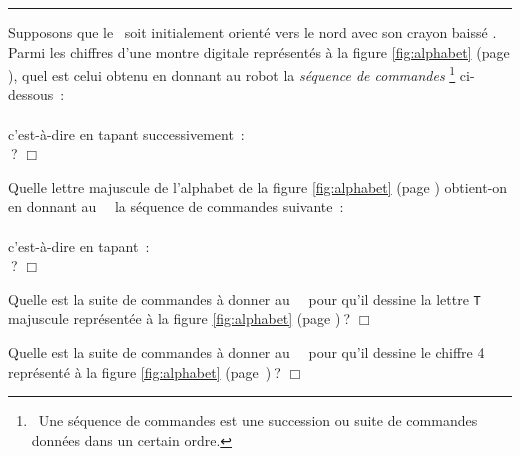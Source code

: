\clearpage\nopagebreak
\noindent \rule{137mm}{0.1mm} %
\begin{exercice}{
Supposons que le \robot\ soit initialement orienté vers le nord
avec son crayon baissé \robotCbN\/.  Parmi les chiffres d'une montre digitale 
re\-pré\-sen\-tés à la figure \ref{fig:alphabet} (page \pageref{fig:alphabet}), quel est
celui obtenu en donnant au robot la {\em séquence de commandes}%
\footnote{\ Une séquence  de commandes est une succession ou suite de commandes données dans un certain ordre.}
  \hbox{ci-dessous~:}\\
\hspace*{2ex}{\idt pqtd$;$ av$;$ pqtg$;$ av$;$ av$;$ pqtg$;$ av$;$ pqtg$;$ av$;$ pqtg$;$ av$;$}\\
c'est-à-dire en tapant \hbox{successivement~:}\\
\hspace*{2ex}\touche{$+$}  \touche{$-$}   \touche{$-$}  \touche{$-$} 
 \touche{$-$} $\:$?
$\Box$}\end{exercice}

\begin{exercice}{
Quelle lettre majuscule de l'alphabet  de la figure \ref{fig:alphabet} (page \pageref{fig:alphabet})
obtient-on en donnant au \robot\ \robotCbN\ la séquence de commandes \hbox{suivante~:}\\
\hspace*{2ex}{\idt av$;$ av$;$ pqtd$;$ av$;$ pqtd$;$ pqtd$;$ av$;$ pqtd$;$ av$;$ av$;$ pqtd$;$ av$;$ av$;$}\\
c'est-à-dire en \hbox{tapant~:}\\
\hspace*{2ex}  \touche{$+$}  \touche{$+$} \touche{$+$}  \touche{$+$}  
 \touche{$+$}  $\:$?
$\Box$}\end{exercice}

\begin{exercice}{
Quelle est la suite de commandes à donner au \robot\ \robotCbN\ pour qu'il dessine 
la lettre {\tt T} majuscule représentée à la figure \ref{fig:alphabet} (page \pageref{fig:alphabet})$\:$?
$\Box$}\end{exercice}

\begin{exercice}{
Quelle est la suite de commandes à donner au \robot\ \robotCbN\ pour qu'il dessine le chiffre 4 
représenté à la figure \ref{fig:alphabet} \hbox{(page \pageref{fig:alphabet})$\:$?}
$\Box$}\end{exercice}

